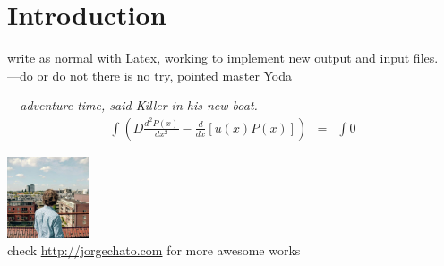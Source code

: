 \chapter{Introduction}
write as normal with Latex, working to implement new output and input files.\\
---do or do not there is no try, pointed master Yoda\par
\textit{---adventure time, said Killer in his new boat.}\\
\begin{eqnarray}
\int ( D \frac{d^2 P(x)}{dx^2}-\frac{d}{dx}[u(x)P(x)] ) & = & \int 0
\end{eqnarray}\par
\includegraphics[width=0.18\textwidth]{./images/0.jpg}\\
check \url{http://jorgechato.com} for more awesome works
